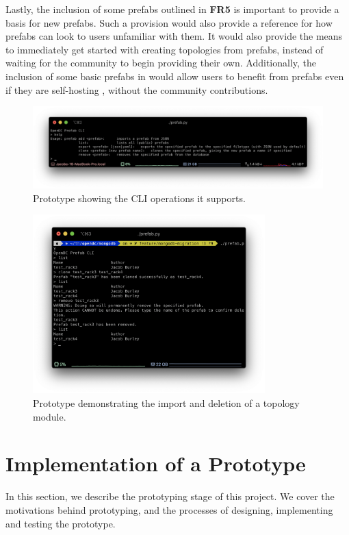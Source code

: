 \documentclass[11pt]{article}
\begin{document}
		Lastly, the inclusion of some \opendc{} prefabs outlined in \textbf{FR5} is important to provide a basis for new prefabs.
		Such a provision would also provide a reference for how prefabs can look to users unfamiliar with them.
		It would also provide the means to immediately get started with creating topologies from prefabs, instead of waiting for the community to begin providing their own.
		Additionally, the inclusion of some basic prefabs in \opendc{} would allow users to benefit from prefabs even if they are self-hosting \opendc{}, without the community contributions.

\newpage

\begin{figure}[]
	\centering
	\includegraphics[width=\textwidth]{prototype1.png}
	\caption[Prototype showing the CLI operations it supports]{Prototype showing the CLI operations it supports.}
	\label{fig:prototype1}
\end{figure}
\begin{figure}[]
	\centering
	\includegraphics[width=0.8\textwidth]{prototype2.png}
	\caption[Prototype demonstrating the import and deletion of a topology module]{Prototype demonstrating the import and deletion of a topology module.}
	\label{fig:prototype2}
\end{figure}


\section{Implementation of a Prototype} \label{sec:prototype}
	In this section, we describe the prototyping stage of this project.
	We cover the motivations behind prototyping, and the processes of designing, implementing and testing the prototype.
\end{document}
